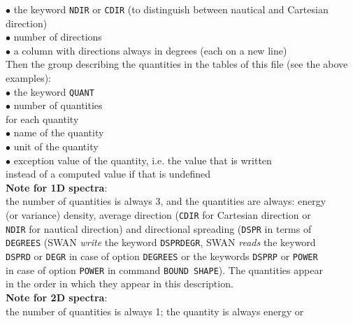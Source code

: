 \documentclass[12pt]{book}
\begin{document}
\begin{tabbing}
                       {$\bullet$} the keyword {\tt NDIR} or {\tt CDIR} (to distinguish between nautical and Cartesian direction)\\
                       {$\bullet$} number of directions\\
                       {$\bullet$} a column with directions always in degrees (each on a new line)\-\\
Then                \> the group describing the quantities in the tables of this file (see the above examples):\+\\
                       {$\bullet$} the keyword {\tt QUANT}\\
                       {$\bullet$} number of quantities\\
                       for each quantity\+\\
                       {$\bullet$} name of the quantity\\
                       {$\bullet$} unit of the quantity\\
                       {$\bullet$} exception value of the quantity, i.e. the value that is written\\
                       instead of a computed value if that is undefined\-\-\\
                    \> {\bf Note for 1D spectra}:\+\\
                       the number of quantities is always 3, and the quantities are always: energy\\
                       (or variance) density, average direction ({\tt CDIR} for Cartesian direction or\\
                       {\tt NDIR} for nautical direction) and directional spreading ({\tt DSPR} in terms of \\
                       {\tt DEGREES} (SWAN {\it write} the keyword {\tt DSPRDEGR}, SWAN {\it reads} the keyword\\
                       {\tt DSPRD} or {\tt DEGR} in case of option {\tt DEGREES} or the keywords {\tt DSPRP} or {\tt POWER}\\
                       in case of option {\tt POWER} in command {\tt BOUND SHAPE}). The quantities appear\\
                       in the order in which they appear in this description.\\
                       {\bf Note for 2D spectra}:\\
                       the number of quantities is always 1; the quantity is always energy or\\

\end{tabbing}
\end{document}
